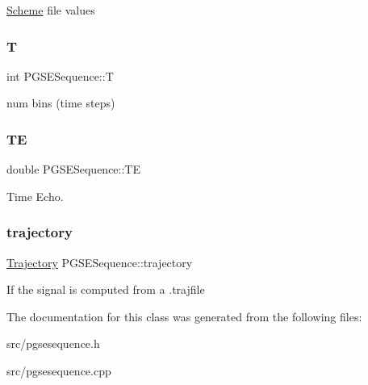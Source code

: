 \hyperlink{class_scheme}{Scheme} file values \mbox{\label{class_p_g_s_e_sequence_a07e27e6e8a8506521386a291d62e8423}} 
\subsubsection{\texorpdfstring{T}{T}}
{\footnotesize\ttfamily int P\+G\+S\+E\+Sequence\+::T}

num bins (time steps) \mbox{\label{class_p_g_s_e_sequence_a06df939859fd2ed6104bfee584f893a1}} 
\subsubsection{\texorpdfstring{TE}{TE}}
{\footnotesize\ttfamily double P\+G\+S\+E\+Sequence\+::\+TE}

Time Echo. \mbox{\label{class_p_g_s_e_sequence_a0fd0fb458384bfb65070fdab5165dde5}} 
\subsubsection{\texorpdfstring{trajectory}{trajectory}}
{\footnotesize\ttfamily \hyperlink{class_trajectory}{Trajectory} P\+G\+S\+E\+Sequence\+::trajectory}

If the signal is computed from a .trajfile 

The documentation for this class was generated from the following files\+:\begin{DoxyCompactItemize}
\item 
src/pgsesequence.\+h\item 
src/pgsesequence.\+cpp\end{DoxyCompactItemize}
